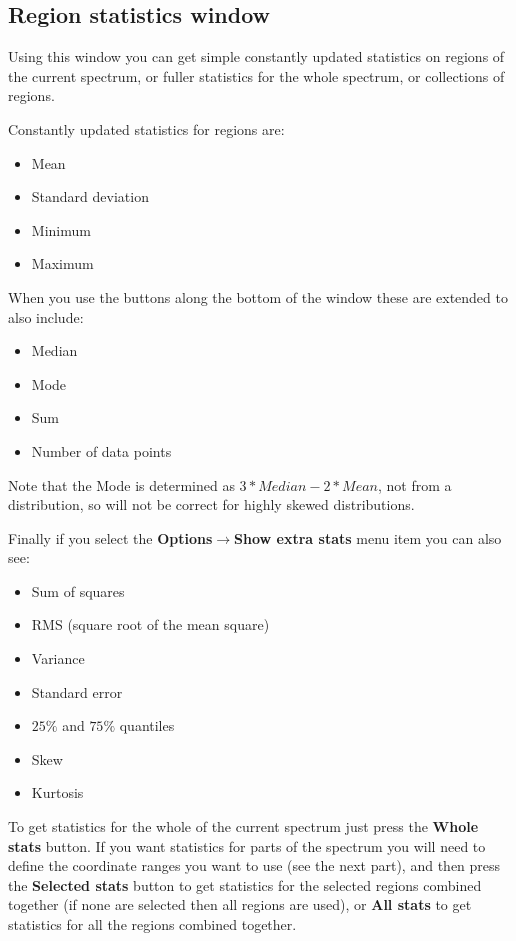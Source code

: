 \documentclass[twoside,11pt]{article}
\newcommand{\latexhtml}[2]{#1}
\renewcommand{\_}{\texttt{\symbol{95}}}
\newcommand{\submenuitem}[2]{\latexhtml{\textbf{#1$\rightarrow$#2}}{\textbf{#1->#2}}}
\newcommand{\labelitem}[1]{\textbf{#1}}
\begin{document}
\newpage
\subsection{Region statistics window}

Using this window you can get simple constantly updated statistics on regions
of the current spectrum, or fuller statistics for the whole spectrum, or
collections of regions.

Constantly updated statistics for regions are:
\begin{itemize}
\item Mean
\item Standard deviation
\item Minimum
\item Maximum
\end{itemize}

When you use the buttons along the bottom of the window these are extended to
also include:
\begin{itemize}
\item Median
\item Mode
\item Sum
\item Number of data points
\end{itemize}
Note that the Mode is determined as $3*Median-2*Mean$, not from a
distribution, so will not be correct for highly skewed distributions.

Finally if you select the \submenuitem{Options}{Show extra stats} menu item
you can also see:
\begin{itemize}
\item Sum of squares
\item RMS (square root of the mean square)
\item Variance
\item Standard error
\item $25\%$ and $75\%$ quantiles
\item Skew
\item Kurtosis
\end{itemize}

To get statistics for the whole of the current spectrum just press the
\labelitem{Whole stats} button. If you want statistics for parts of the
spectrum you will need to define the coordinate ranges you want to use (see
the next part), and then press the \labelitem{Selected stats} button to get
statistics for the selected regions combined together (if none are selected
then all regions are used), or \labelitem{All stats} to get statistics for all
the regions combined together.
\end{document}
